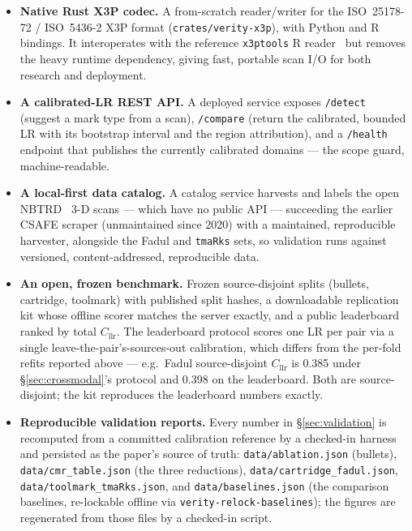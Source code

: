 \documentclass[11pt]{article}
\newcommand{\Cllr}{C_{\mathrm{llr}}}
\newcommand{\code}[1]{\texttt{#1}}
\begin{document}
\begin{itemize}
  \item \textbf{Native Rust X3P codec.} A from-scratch reader/writer for the
        ISO~25178-72 / ISO~5436-2 X3P format (\code{crates/verity-x3p}), with
        Python and R bindings. It interoperates with the reference \code{x3ptools}
        R reader~\cite{x3ptools2024} but removes the heavy runtime dependency,
        giving fast, portable scan I/O for both research and deployment.
  \item \textbf{A calibrated-LR REST API.} A deployed service exposes \code{/detect}
        (suggest a mark type from a scan), \code{/compare} (return the calibrated,
        bounded LR with its bootstrap interval and the region attribution), and a
        \code{/health} endpoint that publishes the currently calibrated domains ---
        the scope guard, machine-readable.
  \item \textbf{A local-first data catalog.} A catalog service harvests and labels
        the open NBTRD~\cite{nbtrd2020} 3-D scans --- which have no public API ---
        succeeding the earlier CSAFE scraper (unmaintained since 2020) with a
        maintained, reproducible harvester, alongside the Fadul and \code{tmaRks}
        sets, so validation runs against versioned, content-addressed, reproducible
        data.
  \item \textbf{An open, frozen benchmark.} Frozen source-disjoint splits
        (bullets, cartridge, toolmark) with published split hashes, a downloadable
        replication kit whose offline scorer matches the server exactly, and a
        public leaderboard ranked by total $\Cllr$. The leaderboard protocol
        scores one LR per pair via a single leave-the-pair's-sources-out
        calibration, which differs from the per-fold refits reported above ---
        e.g.\ Fadul source-disjoint $\Cllr$ is \num{0.385} under
        \S\ref{sec:crossmodal}'s protocol and \num{0.398} on the leaderboard. Both
        are source-disjoint; the kit reproduces the leaderboard numbers exactly.
  \item \textbf{Reproducible validation reports.} Every number in
        \S\ref{sec:validation} is recomputed from a committed calibration reference by a
        checked-in harness and persisted as the paper's source of truth:
        \code{data/ablation.json} (bullets), \code{data/cmr\_table.json} (the three
        reductions), \code{data/cartridge\_fadul.json}, \code{data/toolmark\_tmaRks.json},
        and \code{data/baselines.json} (the comparison baselines, re-lockable offline via
        \code{verity-relock-baselines}); the figures are regenerated from those files by a
        checked-in script.
\end{itemize}
\end{document}
